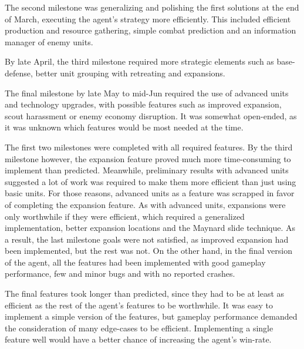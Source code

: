 The second milestone was generalizing and polishing the first solutions at the end of March, executing the agent's strategy more efficiently. This included efficient production and resource gathering, simple combat prediction and an information manager of enemy units.

By late April, the third milestone required more strategic elements such as base-defense, better unit grouping with retreating and expansions.

The final milestone by late May to mid-Jun required the use of advanced units and technology upgrades, with possible features such as improved expansion, scout harassment or enemy economy disruption. It was somewhat open-ended, as it was unknown which features would be most needed at the time.

The first two milestones were completed with all required features. By the third milestone however, the expansion feature proved much more time-consuming to implement than predicted. Meanwhile, preliminary results with advanced units suggested a lot of work was required to make them more efficient than just using basic units. For those reasons, advanced units as a feature was scrapped in favor of completing the expansion feature. As with advanced units, expansions were only worthwhile if they were efficient, which required a generalized implementation, better expansion locations and the Maynard slide technique. As a result, the last milestone goals were not satisfied, as improved expansion had been implemented, but the rest was not. On the other hand, in the final version of the agent, all the features had been implemented with good gameplay performance, few and minor bugs and with no reported crashes.

The final features took longer than predicted, since they had to be at least as efficient as the rest of the agent's features to be worthwhile. It was easy to implement a simple version of the features, but gameplay performance demanded the consideration of many edge-cases to be efficient. Implementing a single feature well would have a better chance of increasing the agent's win-rate.